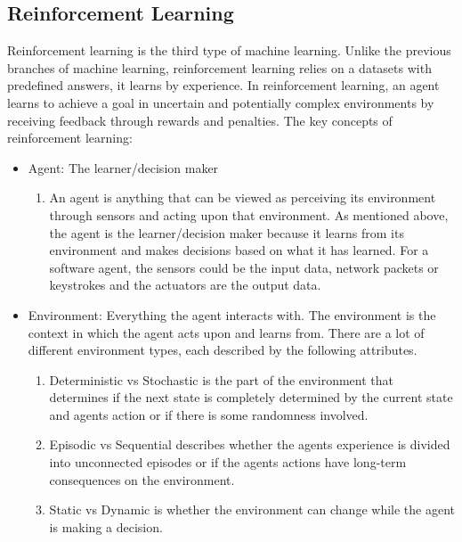 \subsection{Reinforcement Learning}
Reinforcement learning is the third type of machine learning.
Unlike the previous branches of machine learning,
reinforcement learning relies on a datasets with predefined answers, it learns by experience.
In reinforcement learning, an agent learns to achieve a goal in
uncertain and potentially complex environments by receiving feedback
through rewards and penalties. \cite{RL-GeeksForGeeks}
\newline
The key concepts of reinforcement learning:
\begin{itemize}
      \item Agent: The learner/decision maker
            \begin{enumerate}
                  \item An agent is anything that can be viewed as perceiving its environment through
                        sensors and acting upon that environment. As mentioned above, the agent is the learner/decision maker because it
                        learns from its environment and makes decisions based on what it has learned.
                        For a software agent, the sensors could be the input data, network packets or keystrokes
                        and the actuators are the output data. \cite{IntelligentAgents}
            \end{enumerate}
      \item Environment: Everything the agent interacts with. The environment is the context in which the agent acts upon and learns from.
            There are a lot of different environment types, each described by the following attributes. \cite{IntelligentAgents}
            \begin{enumerate}
                  \item Deterministic vs Stochastic is the part of the environment that determines if the next state is completely
                        determined by the current state and agents action or if there is some randomness involved.
                  \item Episodic vs Sequential describes whether the agents experience is divided into unconnected episodes or
                        if the agents actions have long-term consequences on the environment.
                  \item Static vs Dynamic is whether the environment can change while the agent is making a decision.

\end{enumerate}
\end{itemize}
